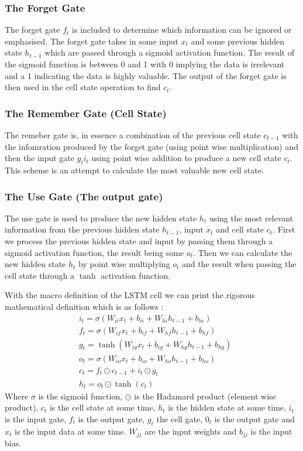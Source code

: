 \documentclass{article}
\begin{document}
\subsubsection{The Forget Gate} 
The forget gate $f_t$ is included to determine which information can be ignored or emphasised. The forget gate takes in some input $x_t$ and some previous hidden state $h_{t-1}$ which are passed through a sigmoid activation function. The result of the sigmoid function is between 0 and 1 with 0 implying the data is irrelevant and a 1 indicating the data is highly valuable. The output of the forget gate is then used in the cell state operation to find $c_t$.
\subsubsection{The Remember Gate (Cell State)} 
The remeber gate is, in essence a combination of the previous cell state $c_{t-1}$ with the infomration produced by the forget gate (using point wise multiplication) and then the input gate $g_t i_t$ using point wise addition to produce a new cell state $c_t$. This scheme is an attempt to calculate the most valuable new cell state.
\subsubsection{The Use Gate (The output gate) } 
The use gate is used to produce the new hidden state $h_t$ using the most relevant information from the previous hidden state $h_{t-1}$, input $x_t$ and cell state $c_t$. First we process the previous hidden state and input by passing them through a sigmoid activation function, the result being some $o_t$. Then we can calculate the new hidden state $h_t$ by point wise multiplying $o_t$ and the result when passing the cell state through a $\tanh$ activation function.


With the macro definition of the LSTM cell we can print the rigorous mathematical definition which is as follows \cite{LSTM}\cite{sak_senior_beaufays_2014}:
\begin{align*}
&i_t = \sigma\left(W_{ii}x_t + b_{ii} + W_{hi}h_{t-1} + b_{hi} \right) \\
&f_t = \sigma\left(W_{if}x_t + b_{if} + W_{hf}h_{t-1} + b_{hf} \right) \\
&g_t = \tanh\left(W_{ig}x_t + b_{ig} + W_{hg}h_{t-1} + b_{hg} \right) \\
&o_t = \sigma\left(W_{io}x_t + b_{io} + W_{ho}h_{t-1} + b_{ho} \right) \\
&c_t = f_t \odot c_{t-1} + i_t \odot g_t \\
&h_t = o_t \odot \tanh(c_t)
\end{align*}
Where $\sigma$ is the sigmoid function, $\odot$ is the Hadamard product (element wise product), $c_t$ is the cell state at some time, $h_t$ is the hidden state at some time, $i_t$ is the input gate, $f_t$ is the output gate, $g_t$ the cell gate, $0_t$ is the output gate and $x_t$ is the input data at some time. $W_{jj}$ are the input weights and $b_{jj}$ is the input bias. 
\end{document}
